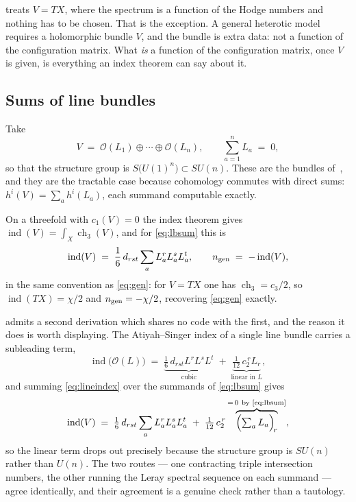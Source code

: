 \documentclass[11pt,a4paper]{article}
\newcommand{\cO}{\mathcal{O}}
\newcommand{\ch}{\operatorname{ch}}
\theoremstyle{definition}
\begin{document}
 treats $V = TX$, where the spectrum is a function of the
Hodge numbers and nothing has to be chosen. That is the exception. A general
heterotic model requires a holomorphic bundle $V$, and the bundle is extra
data: not a function of the configuration matrix. What \emph{is} a function of
the configuration matrix, once $V$ is given, is everything an index theorem can
say about it.

\subsection{Sums of line bundles}

Take
%
\begin{equation}
V \;=\; \cO(L_1) \oplus \cdots \oplus \cO(L_n),
\qquad \sum_{a=1}^{n} L_a \;=\; 0 ,
\label{eq:lbsum}
\end{equation}
%
so that the structure group is $S\bigl(U(1)^n\bigr) \subset SU(n)$. These are
the bundles of~\cite{AndersonGrayLukasPalti2011}, and they are the tractable
case because cohomology commutes with direct sums: $h^i(V) = \sum_a h^i(L_a)$,
each summand computable exactly.

On a threefold with $c_1(V) = 0$ the index theorem gives
$\operatorname{ind}(V) = \int_X \ch_3(V)$, and for \cref{eq:lbsum} this is
%
\begin{equation}
\operatorname{ind}(V)
\;=\; \frac{1}{6}\, d_{rst} \sum_{a} L_a^r L_a^s L_a^t ,
\qquad n_{\rm gen} \;=\; -\operatorname{ind}(V) ,
\label{eq:lbindex}
\end{equation}
%
in the same convention as \cref{eq:gen}: for $V = TX$ one has
$\ch_3 = c_3/2$, so $\operatorname{ind}(TX) = \chi/2$ and $n_{\rm gen} =
-\chi/2$, recovering \cref{eq:gen} exactly.

 admits a second derivation which shares no code with the
first, and the reason it does is worth displaying. The Atiyah--Singer index of
a single line bundle carries a subleading term,
%
\begin{equation}
\operatorname{ind}\bigl(\cO(L)\bigr)
\;=\;
\underbrace{\tfrac{1}{6}\, d_{rst} L^r L^s L^t}_{\text{cubic}}
\;+\;
\underbrace{\tfrac{1}{12}\, c_2^{\,r} L_r}_{\text{linear in } L} ,
\label{eq:lineindex}
\end{equation}
%
and summing \cref{eq:lineindex} over the summands of \cref{eq:lbsum} gives
%
\begin{equation}
\operatorname{ind}(V)
\;=\;
\tfrac{1}{6}\, d_{rst} \sum_a L_a^r L_a^s L_a^t
\;+\;
\tfrac{1}{12}\, c_2^{\,r}
\overbrace{\Bigl(\textstyle\sum_a L_a\Bigr)_{\!r}}^{=\,0
\ \text{by \cref{eq:lbsum}}} ,
\end{equation}
%
so the linear term drops out precisely because the structure group is
$SU(n)$ rather than $U(n)$. The two routes --- one contracting triple
intersection numbers, the other running the Leray spectral sequence on each
summand --- agree identically, and their agreement is a genuine check rather
than a tautology.
\end{document}
